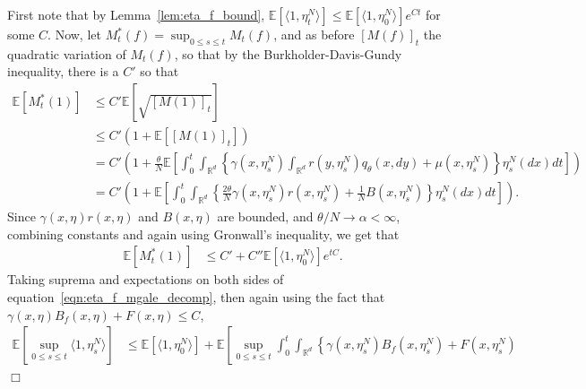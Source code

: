 \documentclass[12pt]{article}
\newenvironment {proof}{{\noindent\bf Proof }}{\hfill $\Box$ \medskip}
\newcommand{\IE}{\mathbb E}
\newcommand{\IR}{\mathbb R}
\begin{document}
\begin{proof}
    First note that by Lemma~\ref{lem:eta_f_bound},
    $\IE[\langle 1, \eta^N_t \rangle] \le \IE[\langle 1, \eta^N_0 \rangle] e^{Ct}$
    for some $C$.
    Now, let $M^*_t(f) = \sup_{0 \le s \le t} M_t(f)$,
    and as before $[M(f)]_t$ the quadratic variation of $M_t(f)$,
    so that by the Burkholder-Davis-Gundy inequality, there is a $C'$ so that
    \begin{align*}
        \IE\left[ M^*_t(1) \right]
        &\le
        C' \IE\left[ \sqrt{[M(1)]_t} \right]
        \\ &\le
        C'\left( 1 + \IE\left[ [M(1)]_t \right] \right)
        \\ &=
        C'\left( 1 + \frac{\theta}{N} \IE\left[
            \int_0^t
            \int_{\IR^d} \left\{
                \gamma(x, \eta^N_s)
                \int_{\IR^d} r(y, \eta^N_s) q_\theta(x, dy)
                + \mu(x, \eta^N_s)
            \right\} \eta_s^N(dx)
            dt
            \right] \right)
        \\ &=
        C'\left( 1 + \IE\left[
            \int_0^t
            \int_{\IR^d} \left\{
                \frac{2\theta}{N} \gamma(x, \eta^N_s) r(x, \eta^N_s)
                + \frac{1}{N} B(x, \eta^N_s)
            \right\} \eta_s^N(dx)
            dt
            \right] \right) .
    \end{align*}
    Since $\gamma(x, \eta) r(x, \eta)$ and $B(x, \eta)$ are bounded,
    and $\theta/N \to \alpha < \infty$,
    combining constants and again using Gronwall's inequality, we get that
    \begin{align*}
        \IE\left[ M^*_t(1) \right]
        &\le
        C' + C'' \IE[ \langle 1, \eta_0^N \rangle ] e^{tC} .
    \end{align*}
    Taking suprema and expectations on both sides of equation~\eqref{eqn:eta_f_mgale_decomp},
    then again using the fact that $\gamma(x, \eta) B_f(x, \eta) + F(x, \eta) \le C$,
    \begin{align*}
        \IE\left[\sup_{0 \le s \le t} \langle 1, \eta^N_s \rangle \right]
        &\le
        \IE[\langle 1, \eta^N_0 \rangle]
        + \IE\left[
            \sup_{0 \le s \le t}
            \int_0^t \int_{\IR^d} \left\{
                \gamma(x, \eta^N_s)
                B_f(x, \eta^N_s)
                + F(x, \eta^N_s)

\end{align*}
\end{proof}
\end{document}
